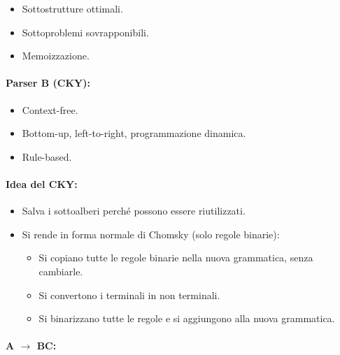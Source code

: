 \begin{itemize}
  \item Sottostrutture ottimali. 
  \item Sottoproblemi sovrapponibili. 
  \item Memoizzazione.
\end{itemize}



\paragraph{Parser B (CKY):}

\begin{itemize}
  \item Context-free. 
  \item Bottom-up, left-to-right, programmazione dinamica. 
  \item Rule-based.
\end{itemize}

\paragraph{Idea del CKY:}

\begin{itemize}
  \item Salva i sottoalberi perché possono essere riutilizzati. 
  \item Si rende in forma normale di Chomsky (solo regole binarie): 
    \begin{itemize}
      \item Si copiano tutte le regole binarie nella nuova grammatica, senza cambiarle. 
      \item Si convertono i terminali in non terminali. 
      \item Si binarizzano tutte le regole e si aggiungono alla nuova grammatica.
    \end{itemize}
\end{itemize}

\paragraph{A $\rightarrow$ BC:}

